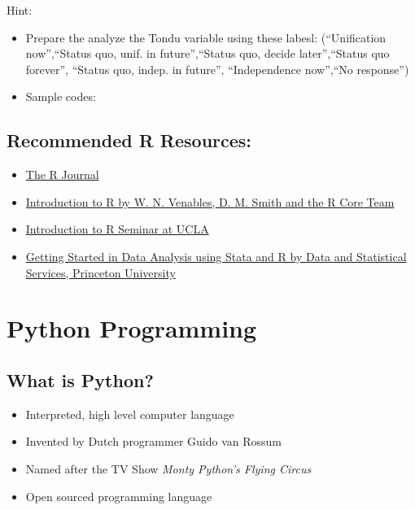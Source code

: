 \documentclass[]{book}
\providecommand{\tightlist}{%
  \setlength{\itemsep}{0pt}\setlength{\parskip}{0pt}}
\begin{document}
Hint:

\begin{itemize}
\tightlist
\item
  Prepare the analyze the Tondu variable using these labesl: (``Unification now'',``Status quo, unif. in future'',``Status quo, decide later'',``Status quo forever'', ``Status quo, indep. in future'', ``Independence now'',``No response'')
\item
  Sample codes:
\end{itemize}

\hypertarget{recommended-r-resources}{%
\section{Recommended R Resources:}\label{recommended-r-resources}}

\begin{itemize}
\tightlist
\item
  \href{http://journal.r-project.org/}{The R Journal}
\item
  \href{http://cran.r-project.org/doc/manuals/R-intro.pdf}{Introduction to R by W. N. Venables, D. M. Smith and the R Core Team}
\item
  \href{http://www.ats.ucla.edu/stat/r/seminars/intro.htm}{Introduction to R Seminar at UCLA}
\item
  \href{https://dss.princeton.edu/training/}{Getting Started in Data Analysis using Stata and R by Data and Statistical Services, Princeton University}
\end{itemize}

\hypertarget{python-programming}{%
\chapter{Python Programming}\label{python-programming}}

\hypertarget{what-is-python}{%
\section{What is Python?}\label{what-is-python}}

\begin{itemize}
\tightlist
\item
  Interpreted, high level computer language
\item
  Invented by Dutch programmer Guido van Rossum
\item
  Named after the TV Show \emph{Monty Python's Flying Circus}
\item
  Open sourced programming language
\end{itemize}
\end{document}
